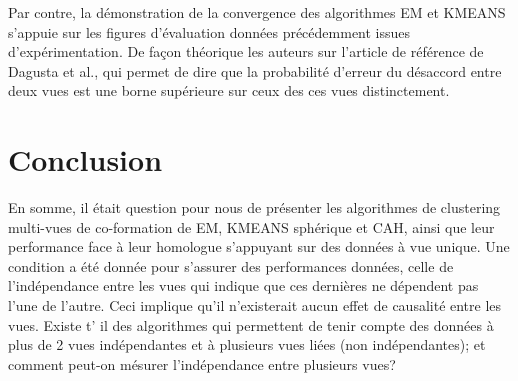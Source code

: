 \documentclass[12pt, french, latin.medieval, a4paper]{report}
\begin{document}
        Par contre, la démonstration de la convergence des algorithmes EM et KMEANS s'appuie sur les figures d'évaluation données précédemment issues d'expérimentation. De façon théorique les auteurs sur l'article de référence \cite{dasgupta2001pac} de Dagusta et al., qui permet de dire que la probabilité d'erreur du désaccord entre deux vues est une borne supérieure sur ceux des ces vues distinctement.
    
    
    \section{Conclusion}
        En somme, il était question pour nous de présenter les algorithmes de clustering multi-vues de co-formation de EM, KMEANS sphérique et CAH, ainsi que leur performance face à leur homologue s'appuyant sur des données à vue unique.
    	Une condition a été donnée pour s'assurer des performances données, celle de l'indépendance entre les vues qui indique que ces dernières ne dépendent pas l'une de l'autre. Ceci implique qu'il n'existerait aucun effet de causalité entre les vues. Existe t' il des algorithmes qui permettent de tenir compte des données à plus de 2 vues indépendantes et à plusieurs vues liées (non indépendantes); et comment peut-on mésurer l'indépendance entre plusieurs vues?
   

    
\end{document}
